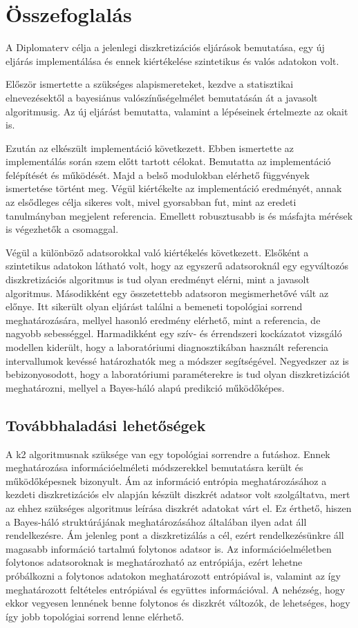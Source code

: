 \chapter{Összefoglalás}
A Diplomaterv célja a jelenlegi diszkretizációs eljárások bemutatása, egy új eljárás implementálása és ennek kiértékelése szintetikus és valós adatokon volt.

Először ismertette a szükséges alapismereteket, kezdve a statisztikai elnevezésektől a bayesiánus valószínűségelmélet bemutatásán át a javasolt algoritmusig. Az új eljárást bemutatta, valamint a lépéseinek értelmezte az okait is.

Ezután az elkészült implementáció következett. Ebben ismertette az implementálás során szem előtt tartott célokat. Bemutatta az implementáció felépítését és működését. Majd a belső modulokban elérhető függvények ismertetése történt meg. Végül kiértékelte az implementáció eredményét, annak az elsődleges célja sikeres volt, mivel gyorsabban fut, mint az eredeti tanulmányban megjelent referencia. Emellett robusztusabb is és másfajta mérések is végezhetők a csomaggal.

Végül a különböző adatsorokkal való kiértékelés következett. Elsőként a szintetikus adatokon látható volt, hogy az egyszerű adatsoroknál egy egyváltozós diszkretizációs algoritmus is tud olyan eredményt elérni, mint a javasolt algoritmus. Másodikként egy összetettebb adatsoron megismerhetővé vált az előnye. Itt sikerült olyan eljárást találni a bemeneti topológiai sorrend meghatározására, mellyel hasonló eredmény elérhető, mint a referencia, de nagyobb sebességgel. Harmadikként egy szív- és érrendszeri kockázatot vizsgáló modellen kiderült, hogy a laboratóriumi diagnosztikában használt referencia intervallumok kevéssé határozhatók meg a módszer segítségével. Negyedszer az is bebizonyosodott, hogy a laboratóriumi paraméterekre is tud olyan diszkretizációt meghatározni, mellyel a Bayes-háló alapú predikció működőképes.

\section{Továbbhaladási lehetőségek}
A k2 algoritmusnak szüksége van egy topológiai sorrendre a futáshoz. Ennek meghatározása információelméleti módszerekkel bemutatásra került és működőképesnek bizonyult. Ám az információ entrópia meghatározásához a kezdeti diszkretizációs elv alapján készült diszkrét adatsor volt szolgáltatva, mert az ehhez szükséges algoritmus leírása diszkrét adatokat várt el. Ez érthető, hiszen a Bayes-háló struktúrájának meghatározásához általában ilyen adat áll rendelkezésre. Ám jelenleg pont a diszkretizálás a cél, ezért rendelkezésünkre áll magasabb információ tartalmú folytonos adatsor is. Az információelméletben folytonos adatsoroknak is meghatározható az entrópiája, ezért lehetne próbálkozni a folytonos adatokon meghatározott entrópiával is, valamint az így meghatározott feltételes entrópiával és együttes információval. A nehézség, hogy ekkor vegyesen lennének benne folytonos és diszkrét változók, de lehetséges, hogy így jobb topológiai sorrend lenne elérhető.

